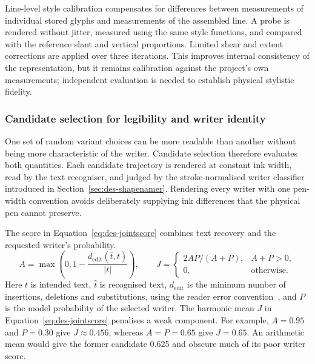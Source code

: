 Line-level style calibration compensates for differences between measurements of individual stored glyphs and measurements of the assembled line. A probe is rendered without jitter, measured using the same style functions, and compared with the reference slant and vertical proportions. Limited shear and extent corrections are applied over three iterations. This improves internal consistency of the representation, but it remains calibration against the project's own measurements; independent evaluation is needed to establish physical stylistic fidelity.

\subsubsection{Candidate selection for legibility and writer identity}
\label{sec:des-selection}
One set of random variant choices can be more readable than another without being more characteristic of the writer. Candidate selection therefore evaluates both quantities. Each candidate trajectory is rendered at constant ink width, read by the text recogniser, and judged by the stroke-normalised writer classifier introduced in Section~\ref{sec:des-shapenamer}. Rendering every writer with one pen-width convention avoids deliberately supplying ink differences that the physical pen cannot preserve.

The score in Equation~\ref{eq:des-jointscore} combines text recovery and the requested writer's probability.
\begin{equation}
A=\max\left(0,1-\frac{d_{\mathrm{edit}}(\widehat t,t)}{|t|}\right),\qquad
J=\begin{cases}2AP/(A+P),&A+P>0,\\0,&\text{otherwise}.\end{cases}
\label{eq:des-jointscore}
\end{equation}
Here $t$ is intended text, $\widehat t$ is recognised text, $d_{\mathrm{edit}}$ is the minimum number of insertions, deletions and substitutions, using the reader error convention~\cite[PDF p.~2, Sec.~2.1]{graves2006}, and $P$ is the model probability of the selected writer. The harmonic mean $J$ in Equation~\ref{eq:des-jointscore} penalises a weak component. For example, $A=0.95$ and $P=0.30$ give $J\approx0.456$, whereas $A=P=0.65$ give $J=0.65$. An arithmetic mean would give the former candidate 0.625 and obscure much of its poor writer score.

